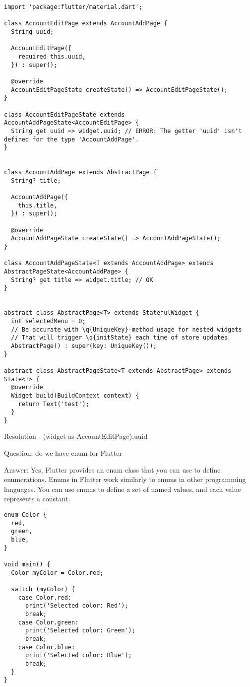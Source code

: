 \begin{lstlisting}
import 'package:flutter/material.dart';

class AccountEditPage extends AccountAddPage {
  String uuid;

  AccountEditPage({
    required this.uuid,
  }) : super();

  @override
  AccountEditPageState createState() => AccountEditPageState();
}

class AccountEditPageState extends AccountAddPageState<AccountEditPage> {
  String get uuid => widget.uuid; // ERROR: The getter 'uuid' isn't defined for the type 'AccountAddPage'.
}


class AccountAddPage extends AbstractPage {
  String? title;

  AccountAddPage({
    this.title,
  }) : super();

  @override
  AccountAddPageState createState() => AccountAddPageState();
}

class AccountAddPageState<T extends AccountAddPage> extends AbstractPageState<AccountAddPage> {
  String? get title => widget.title; // OK
}


abstract class AbstractPage<T> extends StatefulWidget {
  int selectedMenu = 0;
  // Be accurate with \q{UniqueKey}-method usage for nested widgets
  // That will trigger \q{initState} each time of store updates 
  AbstractPage() : super(key: UniqueKey());
}

abstract class AbstractPageState<T extends AbstractPage> extends State<T> {
  @override
  Widget build(BuildContext context) {
    return Text('test');
  }
}
\end{lstlisting}

Resolution - (widget as AccountEditPage).uuid


Question: do we have enum for Flutter

Answer: Yes, Flutter provides an enum class that you can use to define enumerations. Enums in Flutter work similarly to 
enums in other programming languages. You can use enums to define a set of named values, and each value represents 
a constant.

\begin{lstlisting}
enum Color {
  red,
  green,
  blue,
}

void main() {
  Color myColor = Color.red;

  switch (myColor) {
    case Color.red:
      print('Selected color: Red');
      break;
    case Color.green:
      print('Selected color: Green');
      break;
    case Color.blue:
      print('Selected color: Blue');
      break;
  }
}
\end{lstlisting}

